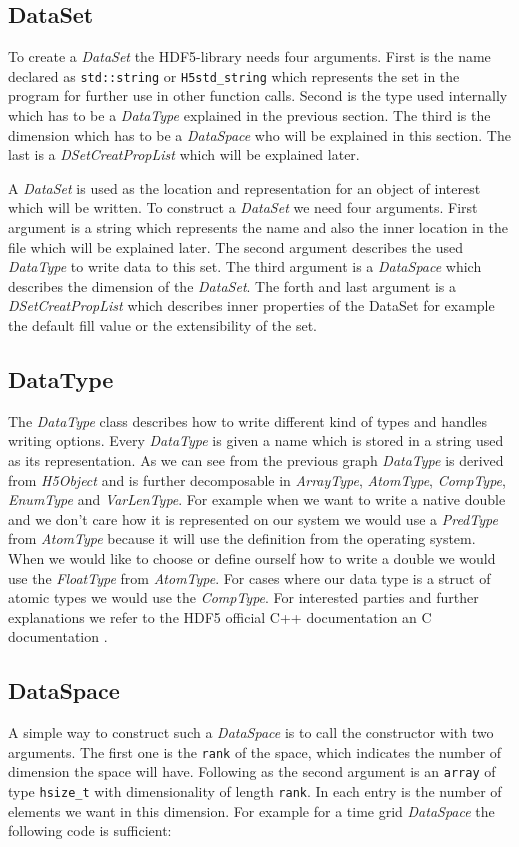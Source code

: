 \documentclass{article}
\begin{document}
\subsection{DataSet}
To create a \textit{DataSet} the HDF5-library needs four arguments. First is the name declared as \texttt{std::string} or \texttt{H5std\_string} which represents the set in the program for further use in other function calls. Second is the type used internally which has to be a \textit{DataType} explained in the previous section. The third is the dimension which has to be a \textit{DataSpace} who will be explained in this section. The last is a \textit{DSetCreatPropList} which will be explained later.

A \textit{DataSet} is used as the location and representation for an object of interest which will be written. To construct a \textit{DataSet} we need four arguments. First argument is a string which represents the name and also the inner location in the file which will be explained later. The second argument describes the used \textit{DataType} to write data to this set. The third argument is a \textit{DataSpace} which describes the dimension of the \textit{DataSet}. The forth and last argument is a \textit{DSetCreatPropList} which describes inner properties of the DataSet for example the default fill value or the extensibility of the set.
\subsection{DataType}
The \textit{DataType} class describes how to write different kind of types and handles writing options. Every \textit{DataType} is given a name which is stored in a string used as its representation. As we can see from the previous graph \textit{DataType} is derived from \textit{H5Object} and is further decomposable in \textit{ArrayType}, \textit{AtomType}, \textit{CompType}, \textit{EnumType} and \textit{VarLenType}. For example when we want to write a native double and we don't care how it is represented on our system we would use a \textit{PredType} from \textit{AtomType} because it will use the definition from the operating system. When we would like to choose or define ourself how to write a double we would use the \textit{FloatType} from \textit{AtomType}. For cases where our data type is a struct of atomic types we would use the \textit{CompType}. For interested parties and further explanations we refer to the HDF5 official C++ documentation\cite{hdf5cppdoc} an C documentation \cite{hdf5cdoc}.
\subsection{DataSpace}
 A simple way to construct such a \textit{DataSpace} is to call the constructor with two arguments. The first one is the \texttt{rank} of the space, which indicates the number of dimension the space will have. Following as the second argument is an \texttt{array} of type \texttt{hsize\_t} with dimensionality of length \texttt{rank}. In each entry is the number of elements we want in this dimension. For example for a time grid \textit{DataSpace} the following code is sufficient:\\
\end{document}
